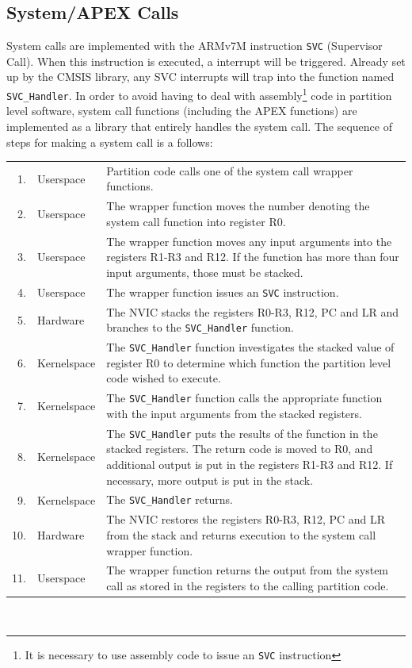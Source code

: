 \subsection{System/APEX Calls}
System calls are implemented with the ARMv7M instruction \texttt{SVC} (Supervisor
Call). When this instruction is executed, a interrupt will be triggered. Already
set up by the CMSIS library, any SVC interrupts will trap into the function
named \texttt{SVC\_Handler}.
In order to avoid having to deal with assembly\footnote{It is necessary to use
assembly code to issue an \texttt{SVC} instruction} code in partition level
software, system call functions (including the APEX functions) are implemented
as a library that entirely handles the system call.
The sequence of steps for making a system call is a follows:\\

\noindent\begin{tabular}{ r l p{10.5cm} }
    1. & Userspace & Partition code calls one of the system call wrapper
    functions.\\
    2. & Userspace & The wrapper function moves the number denoting the system
    call function into register R0.\\
    3. & Userspace & The wrapper function moves any input arguments into the
    registers R1-R3 and R12. If the function has more than four input arguments,
    those must be stacked.\\
    4. & Userspace & The wrapper function issues an \texttt{SVC} instruction.\\
    5. & Hardware & The NVIC stacks the registers R0-R3, R12, PC and LR and
    branches to the \texttt{SVC\_Handler} function.\\
    6. & Kernelspace & The \texttt{SVC\_Handler} function investigates the
    stacked value of register R0 to determine which function the partition level
    code wished to execute.\\
    7. & Kernelspace & The \texttt{SVC\_Handler} function calls the appropriate
    function with the input arguments from the stacked registers.\\
    8. & Kernelspace & The \texttt{SVC\_Handler} puts the results of the
    function in the stacked registers. The return code is moved to R0, and
    additional output is put in the registers R1-R3 and R12. If necessary, more
    output is put in the stack.\\
    9. & Kernelspace & The \texttt{SVC\_Handler} returns.\\
    10. & Hardware & The NVIC restores the registers R0-R3, R12, PC and LR from
    the stack and returns execution to the system call wrapper function.\\
    11. & Userspace & The wrapper function returns the output from the system
    call as stored in the registers to the calling partition code.\\
\end{tabular}\\


